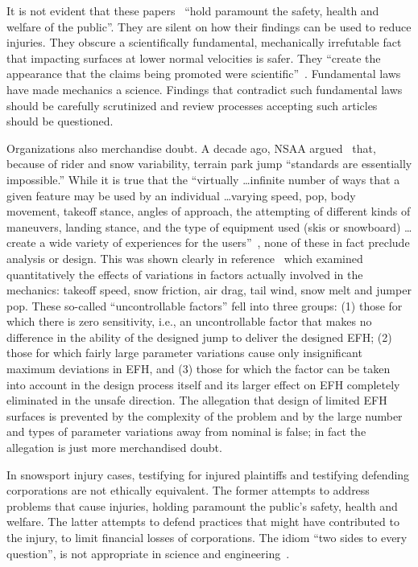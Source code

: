 \documentclass{article}
\begin{document}
It is not evident that these papers~\cite{Shealy2010,Shealy2015,Scher2015}
``hold paramount the safety, health and welfare of the public''. They are
silent on how their findings can be used to reduce injuries. They obscure a
scientifically fundamental, mechanically irrefutable fact that impacting
surfaces at lower normal velocities is safer. They ``create the appearance that
the claims being promoted were scientific''~\cite[page 244]{Oreskes2010}.
Fundamental laws have made mechanics a science. Findings that contradict such
fundamental laws should be carefully scrutinized and review processes accepting
such articles should be questioned.

Organizations also merchandise doubt. A decade ago, NSAA argued~\cite{NSAA2008}
that, because of rider and snow variability, terrain park jump ``standards are
essentially impossible.'' While it is true that the ``virtually \ldots infinite
number of ways that a given feature may be used by an individual \ldots varying
speed, pop, body movement, takeoff stance, angles of approach, the attempting
of different kinds of maneuvers, landing stance, and the type of equipment used
(skis or snowboard) \ldots create a wide variety of experiences for the
users''~\cite{NSAA2008}, none of these in fact preclude analysis or design.
This was shown clearly in reference~\cite{Hubbard2012} which examined
quantitatively the effects of variations in factors actually involved in the
mechanics: takeoff speed, snow friction, air drag, tail wind, snow melt and
jumper pop. These so-called ``uncontrollable factors'' fell into three groups:
(1) those for which there is zero sensitivity, i.e., an uncontrollable factor
that makes no difference in the ability of the designed jump to deliver the
designed EFH; (2) those for which fairly large parameter variations cause only
insignificant maximum deviations in EFH, and (3) those for which the factor can
be taken into account in the design process itself and its larger effect on EFH
completely eliminated in the unsafe direction. The allegation that design of
limited EFH surfaces is prevented by the complexity of the problem and by the
large number and types of parameter variations away from nominal is false; in
fact the allegation is just more merchandised doubt.

In snowsport injury cases, testifying for injured plaintiffs and testifying
defending corporations are not ethically equivalent. The former attempts to
address problems that cause injuries, holding paramount the public's safety,
health and welfare. The latter attempts to defend practices that might have
contributed to the injury, to limit financial losses of corporations. The idiom
``two sides to every question'', is not appropriate in science and
engineering~\cite[page 268]{Oreskes2010}.
\end{document}
